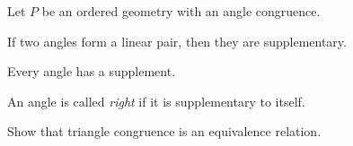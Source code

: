 \begin{prop}
Let $P$ be an ordered geometry with an angle congruence.
\begin{proplist}
\item If two angles form a linear pair, then they are supplementary.
\item Every angle has a supplement.
\end{proplist}
\end{prop}

\begin{dfn}
An angle is called \emph{right} if it is supplementary to itself.
\end{dfn}


\Exercises%

\begin{exercise}
Show that triangle congruence is an equivalence relation.
\end{exercise}
